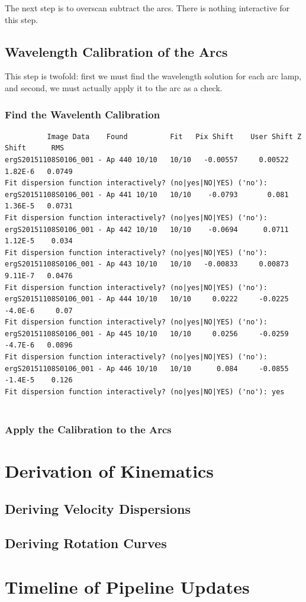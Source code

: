 \documentclass[12pt]{report}
\begin{document}
The next step is to overscan subtract the arcs. There is nothing interactive for this step.

\section{Wavelength Calibration of the Arcs}

This step is twofold: first we must find the wavelength solution for each arc lamp, and second, we must actually apply it to the arc as a check.

\subsection{Find the Wavelenth Calibration}

\begin{verbatim}
          Image Data    Found          Fit   Pix Shift    User Shift Z Shift      RMS
ergS20151108S0106_001 - Ap 440 10/10   10/10   -0.00557     0.00522  1.82E-6   0.0749
Fit dispersion function interactively? (no|yes|NO|YES) ('no'): 
ergS20151108S0106_001 - Ap 441 10/10   10/10    -0.0793       0.081  1.36E-5   0.0731
Fit dispersion function interactively? (no|yes|NO|YES) ('no'): 
ergS20151108S0106_001 - Ap 442 10/10   10/10    -0.0694      0.0711  1.12E-5    0.034
Fit dispersion function interactively? (no|yes|NO|YES) ('no'): 
ergS20151108S0106_001 - Ap 443 10/10   10/10   -0.00833     0.00873  9.11E-7   0.0476
Fit dispersion function interactively? (no|yes|NO|YES) ('no'): 
ergS20151108S0106_001 - Ap 444 10/10   10/10     0.0222     -0.0225  -4.0E-6     0.07
Fit dispersion function interactively? (no|yes|NO|YES) ('no'): 
ergS20151108S0106_001 - Ap 445 10/10   10/10     0.0256     -0.0259  -4.7E-6   0.0896
Fit dispersion function interactively? (no|yes|NO|YES) ('no'): 
ergS20151108S0106_001 - Ap 446 10/10   10/10      0.084     -0.0855  -1.4E-5    0.126
Fit dispersion function interactively? (no|yes|NO|YES) ('no'): yes


\end{verbatim}

\subsection{Apply the Calibration to the Arcs}




\chapter{Derivation of Kinematics}

\section{Deriving Velocity Dispersions}
\section{Deriving Rotation Curves}

\chapter{Timeline of Pipeline Updates}


\end{document}
